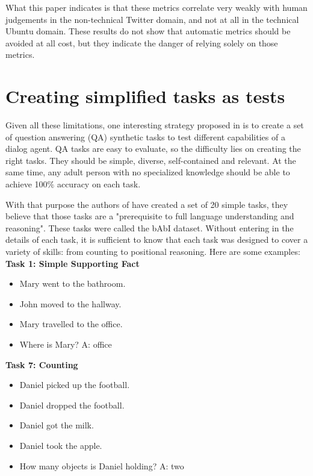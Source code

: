 What this paper indicates is that these metrics correlate very weakly with human judgements in the non-technical Twitter domain, and not at all in the technical Ubuntu domain. These results do not show that automatic metrics should be avoided at all cost, but they indicate the danger of relying solely on those metrics.

\section{Creating simplified tasks as tests}
\label{ch:03-tasks}

Given all these limitations, one interesting strategy proposed in \cite{WestonBCM15} is to create a set of question answering (QA) synthetic tasks to test different capabilities of a dialog agent. QA tasks are easy to evaluate, so the difficulty lies on creating the right tasks. They should be simple, diverse, self-contained and relevant. At the same time, any adult person with no specialized knowledge should be able to achieve 100$\%$ accuracy on each task.

With that purpose the authors of \cite{WestonBCM15} have created a set of 20 simple tasks, they believe that those tasks are a "prerequisite to full language understanding and reasoning". These tasks were called the bAbI dataset. Without entering in the details of each task, it is sufficient to know that each task was designed to cover a variety of skills: from counting to positional reasoning. Here are some examples:\\

\textbf{Task 1: Simple Supporting Fact} 
\begin{itemize} 
\item[] Mary went to the bathroom.
\item[] John moved to the hallway.
\item[] Mary travelled to the office.
\item[] Where is Mary? A: office
\end{itemize}

\vspace{0.3cm}

\textbf{Task 7: Counting}
\begin{itemize} 
\item[] Daniel picked up the football.
\item[] Daniel dropped the football.
\item[] Daniel got the milk.
\item[] Daniel took the apple.
\item[] How many objects is Daniel holding? A: two
\end{itemize} 

